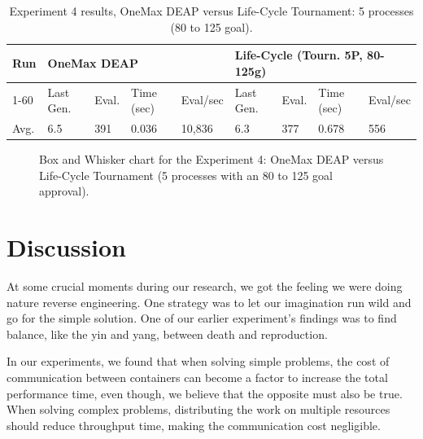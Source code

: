 \documentclass[runningheads]{llncs}
\begin{document}
\begin{table}[]
    \centering        
    \caption{Experiment 4 results, OneMax DEAP versus Life-Cycle Tournament: 5 processes (80 to 125 goal).}\label{tab5}
    \begin{tabular}{|l|l|l|l|l|l|l|l|l|}
    \hline
    Run & \multicolumn{4}{l|}{OneMax DEAP} & \multicolumn{4}{l|}{Life-Cycle (Tourn. 5P, 80-125g)} \\ \hline
    1-60 & Last Gen. & Eval. & Time (sec) & Eval/sec & Last Gen. & Eval. & Time (sec) & Eval/sec \\ \hline
    Avg. & 6.5 & 391 & 0.036 & 10,836 & 6.3 & 377 & 0.678 & 556 \\ \hline
    \end{tabular}
    \end{table}

\begin{figure}
    \caption{Box and Whisker chart for the Experiment 4: OneMax DEAP versus Life-Cycle Tournament (5 processes with an 80 to 125 goal approval).} \label{fig9}
    \end{figure}



\section{Discussion}

At some crucial moments during our research, we got the feeling we were doing
nature reverse engineering. One strategy was to let our imagination run wild
and go for the simple solution. One of our earlier experiment's findings was to
find balance, like the yin and yang, between death and reproduction.

In our experiments, we found that when solving simple problems, the cost of
communication between containers can become a factor to increase the total
performance time, even though, we believe that the opposite must also be true.
When solving complex problems, distributing the work on multiple resources
should reduce throughput time, making the communication cost negligible.
\end{document}
